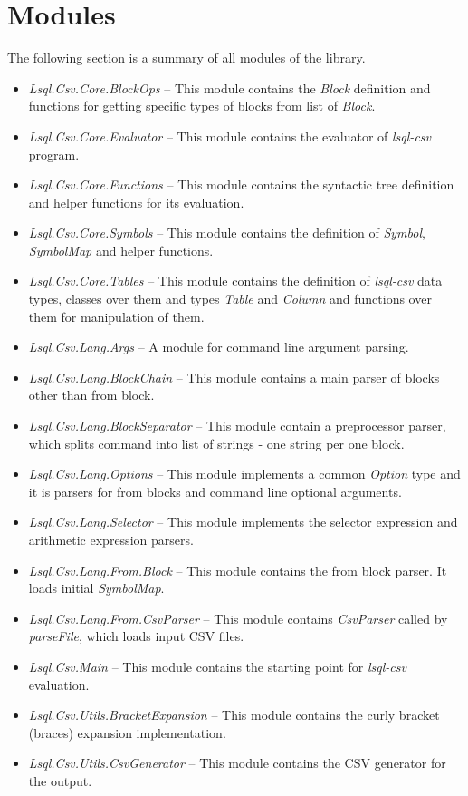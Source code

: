 \section{Modules}
The following section is a summary of all modules of the library.
\begin{itemize}
    \item \textit{Lsql.Csv.Core.BlockOps} -- This module contains the \textit{Block} definition and functions for getting specific types of blocks from list of \textit{Block}.
    \item \textit{Lsql.Csv.Core.Evaluator} -- This module contains the evaluator of \textit{lsql-csv} program.
    \item \textit{Lsql.Csv.Core.Functions} -- This module contains the syntactic tree definition and helper functions for its evaluation.
    \item \textit{Lsql.Csv.Core.Symbols} -- This module contains the definition of \textit{Symbol}, \textit{SymbolMap} and helper functions.
    \item \textit{Lsql.Csv.Core.Tables} -- This module contains the definition of \textit{lsql-csv} 
        data types, classes over them and types \textit{Table} and \textit{Column} and functions over them for manipulation of them.
    \item \textit{Lsql.Csv.Lang.Args} -- A module for command line argument parsing.
    \item \textit{Lsql.Csv.Lang.BlockChain} -- This module contains a main parser of blocks other than from block.
    \item \textit{Lsql.Csv.Lang.BlockSeparator} -- This module contain a preprocessor parser, which splits command into list of strings - one string per one block.
    \item \textit{Lsql.Csv.Lang.Options} -- This module implements a common \textit{Option} type and it is parsers for from blocks and command line optional arguments.
    \item \textit{Lsql.Csv.Lang.Selector} -- This module implements the selector expression and arithmetic expression parsers.
    \item \textit{Lsql.Csv.Lang.From.Block} -- This module contains the from block parser. It loads initial \textit{SymbolMap}.
    \item \textit{Lsql.Csv.Lang.From.CsvParser} -- This module contains \textit{CsvParser} called by \textit{parseFile}, which loads input CSV files.
    \item \textit{Lsql.Csv.Main} -- This module contains the starting point for \textit{lsql-csv} evaluation.
    \item \textit{Lsql.Csv.Utils.BracketExpansion} -- This module contains the curly bracket (braces) expansion implementation.
    \item \textit{Lsql.Csv.Utils.CsvGenerator} -- This module contains the CSV generator for the output.
\end{itemize}

